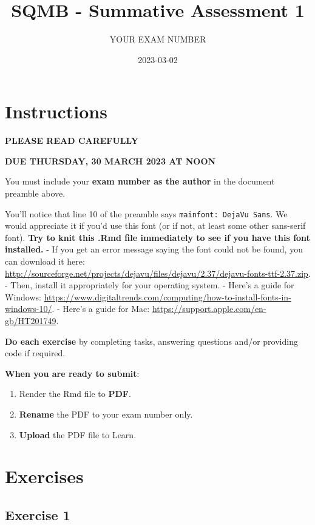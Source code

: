 \documentclass[
]{article}
\title{SQMB - Summative Assessment 1}
\author{YOUR EXAM NUMBER}
\date{2023-03-02}
\providecommand{\tightlist}{%
  \setlength{\itemsep}{0pt}\setlength{\parskip}{0pt}}
\begin{document}
\maketitle

\hypertarget{instructions}{%
\section{Instructions}\label{instructions}}

\textbf{PLEASE READ CAREFULLY}

\textbf{DUE THURSDAY, 30 MARCH 2023 AT NOON}

You must include your \textbf{exam number as the author} in the document
preamble above.

You'll notice that line 10 of the preamble says
\texttt{mainfont:\ DejaVu\ Sans}. We would appreciate it if you'd use
this font (or if not, at least some other sans-serif font). \textbf{Try
to knit this .Rmd file immediately to see if you have this font
installed.} - If you get an error message saying the font could not be
found, you can download it here:
\url{http://sourceforge.net/projects/dejavu/files/dejavu/2.37/dejavu-fonts-ttf-2.37.zip}.
- Then, install it appropriately for your operating system. - Here's a
guide for Windows:
\url{https://www.digitaltrends.com/computing/how-to-install-fonts-in-windows-10/}.
- Here's a guide for Mac:
\url{https://support.apple.com/en-gb/HT201749}.

\textbf{Do each exercise} by completing tasks, answering questions
and/or providing code if required.

\textbf{When you are ready to submit}:

\begin{enumerate}
\def\labelenumi{\arabic{enumi}.}
\tightlist
\item
  Render the Rmd file to \textbf{PDF}.
\item
  \textbf{Rename} the PDF to your exam number only.
\item
  \textbf{Upload} the PDF file to Learn.
\end{enumerate}

\hypertarget{exercises}{%
\section{Exercises}\label{exercises}}

\hypertarget{exercise-1}{%
\subsection{Exercise 1}\label{exercise-1}}
\end{document}
